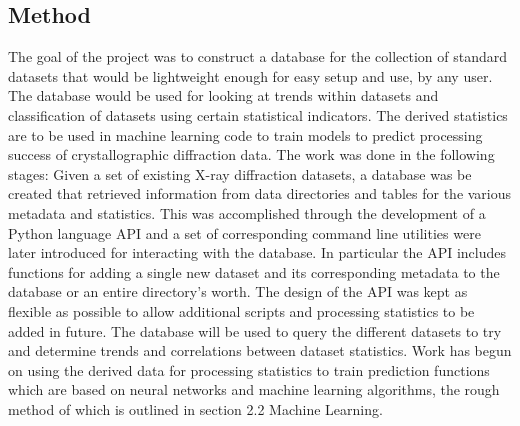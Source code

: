 \documentclass[11pt, a4paper]{article}
\begin{document}
\begin{multicols}{2}
\section{Method}
The goal of the project was to construct a database for the collection of standard datasets that would be lightweight enough for easy setup and use, by any user. The database would be used for looking at trends within datasets and classification of datasets using certain statistical indicators. The derived statistics are to be used in machine learning code to train models to predict processing success of crystallographic diffraction data. The work was done in the following stages: Given a set of existing X-ray diffraction datasets, a database was be created that retrieved information from data directories and tables for the various metadata and statistics. This was accomplished through the development of a Python language API  and a set of corresponding command line utilities were later introduced for interacting with the database. In particular the API includes functions for adding a single new dataset and its corresponding metadata to the database or an entire directory's worth. The design of the API was kept as flexible as possible to allow additional scripts and processing statistics to be added in future. The database will be used to query the different datasets to try and determine trends and correlations between dataset statistics. Work has begun on using the derived data for processing statistics to train prediction functions which are based on neural networks and machine learning algorithms, the rough method of which is outlined in section 2.2 Machine Learning.

\end{multicols}
\end{document}
